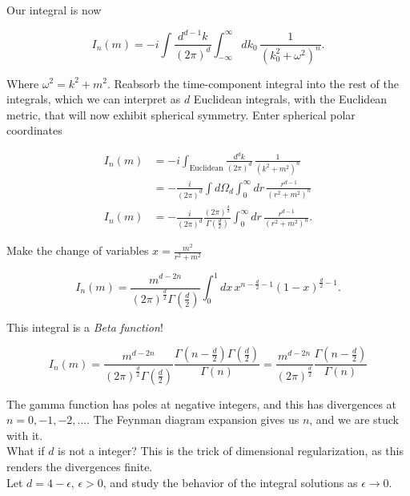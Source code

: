 \noindent Our integral is now

\begin{equation}
I_n(m) = -i \int \frac{d^{d-1} k}{(2 \pi)^d} \int^\infty_{-\infty} dk_0 \, \frac{1}{(k_0^2  + \omega^2)^n}.
\end{equation}

\noindent Where $\omega^2 = k^2 + m^2$. Reabsorb the time-component integral into the rest of the integrals, which we can interpret as $d$ Euclidean integrals, with the Euclidean metric, that will now exhibit spherical symmetry. Enter spherical polar coordinates

\begin{align}
I_n(m) &= -i \int_{\text{Euclidean}} \frac{d^d k}{(2 \pi)^d} \, \frac{1}{(k^2 + m^2)^n} \\
&= -\frac{i}{(2\pi)^d} \int d\Omega_d \int^\infty_0 dr \, \frac{r^{d-1}}{(r^2 + m^2)^n} \\
I_n(m) &= -\frac{i}{(2\pi)^d} \frac{(2\pi)^{\frac{d}{2}}}{\Gamma(\frac{d}{2})} \int^\infty_0 dr \, \frac{r^{d-1}}{(r^2 + m^2)^n} .
\end{align}

\noindent Make the change of variables $x = \frac{m^2}{r^2 + m^2}$

\begin{equation}
I_n(m) = \frac{m^{d-2n}}{(2\pi)^{\frac{d}{2}} \Gamma(\frac{d}{2})} \int_0^1 dx \, x^{n-\frac{d}{2}-1} (1-x)^{\frac{d}{2}-1}.
\end{equation}

\noindent This integral is a \textit{Beta function}!

\begin{equation}
I_n(m) = \frac{m^{d-2n}}{(2\pi)^{\frac{d}{2}} \Gamma(\frac{d}{2})}  \frac{\Gamma(n-\frac{d}{2}) \Gamma(\frac{d}{2})}{\Gamma(n)} = \frac{m^{d-2n}}{(2\pi)^{\frac{d}{2}}}  \frac{\Gamma(n-\frac{d}{2})}{\Gamma(n)}
\end{equation}

\noindent The gamma function has poles at negative integers, and this has divergences at $n=0,-1,-2,\dots$. The Feynman diagram expansion gives us $n$, and we are stuck with it. \\

\noindent What if $d$ is not a integer? This is the trick of dimensional regularization, as this renders the divergences finite. \\

\noindent Let $d = 4-\epsilon$, $\epsilon >0$, and study the behavior of the integral solutions as $\epsilon \rightarrow 0$.

